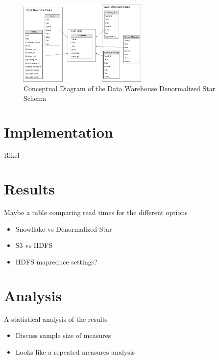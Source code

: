 \documentclass[journal]{IEEEtran}
\begin{document}
	
	\begin{figure}
		\centering
		\includegraphics[width=2.5in]{Star_Conceptual_Schema.png}
		\caption{Conceptual Diagram of the Data Warehouse 
			Denormalized Star Schema}
		\label{star}
	\end{figure}
	
	\section{Implementation}
	
	Rikel
	
	\section{Results}
	
	Maybe a table comparing read times for the different options
	
	\begin{itemize}
		\item Snowflake vs Denormalized Star
		\item S3 vs HDFS
		\item HDFS mapreduce settings?
	\end{itemize}
	
	\section{Analysis}
	
	A statistical analysis of the results
	
	\begin{itemize}
		\item Discuss sample size of measures
		\item Looks like a repeated measures analysis
	\end{itemize}
	
	
\end{document}
